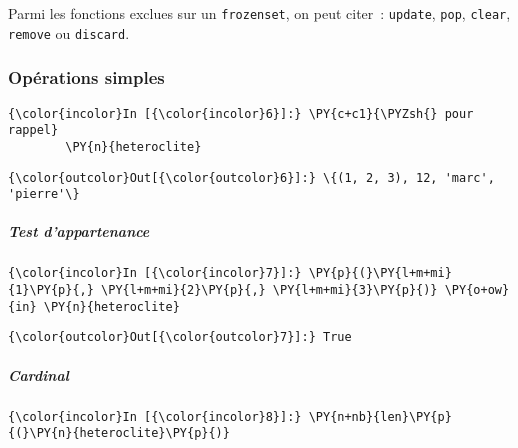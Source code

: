Parmi les fonctions exclues sur un \texttt{frozenset}, on peut citer~:
\texttt{update}, \texttt{pop}, \texttt{clear}, \texttt{remove} ou
\texttt{discard}.

    \hypertarget{opuxe9rations-simples}{%
\subsubsection{Opérations simples}\label{opuxe9rations-simples}}

    \begin{Verbatim}[commandchars=\\\{\},frame=single,framerule=0.3mm,rulecolor=\color{cellframecolor}]
{\color{incolor}In [{\color{incolor}6}]:} \PY{c+c1}{\PYZsh{} pour rappel}
        \PY{n}{heteroclite}
\end{Verbatim}


\begin{Verbatim}[commandchars=\\\{\},frame=single,framerule=0.3mm,rulecolor=\color{cellframecolor}]
{\color{outcolor}Out[{\color{outcolor}6}]:} \{(1, 2, 3), 12, 'marc', 'pierre'\}
\end{Verbatim}
            
    \hypertarget{test-dappartenance}{%
\subparagraph{Test d'appartenance}\label{test-dappartenance}}

    \begin{Verbatim}[commandchars=\\\{\},frame=single,framerule=0.3mm,rulecolor=\color{cellframecolor}]
{\color{incolor}In [{\color{incolor}7}]:} \PY{p}{(}\PY{l+m+mi}{1}\PY{p}{,} \PY{l+m+mi}{2}\PY{p}{,} \PY{l+m+mi}{3}\PY{p}{)} \PY{o+ow}{in} \PY{n}{heteroclite}
\end{Verbatim}


\begin{Verbatim}[commandchars=\\\{\},frame=single,framerule=0.3mm,rulecolor=\color{cellframecolor}]
{\color{outcolor}Out[{\color{outcolor}7}]:} True
\end{Verbatim}
            
    \hypertarget{cardinal}{%
\subparagraph{Cardinal}\label{cardinal}}

    \begin{Verbatim}[commandchars=\\\{\},frame=single,framerule=0.3mm,rulecolor=\color{cellframecolor}]
{\color{incolor}In [{\color{incolor}8}]:} \PY{n+nb}{len}\PY{p}{(}\PY{n}{heteroclite}\PY{p}{)}
\end{Verbatim}


